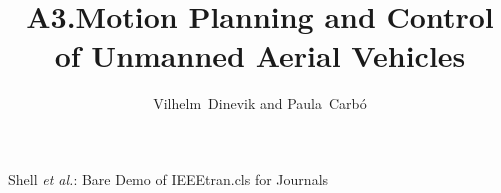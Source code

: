 \documentclass[journal]{IEEEtran}
\begin{document}
	\title{A3.Motion Planning and Control of Unmanned Aerial Vehicles}
	\author{Vilhelm~Dinevik and Paula~Carb\'o}
		
	
	
	{Shell \MakeLowercase{\textit{et al.}}: Bare Demo of IEEEtran.cls for Journals}
	
	\maketitle
	
\end{document}
